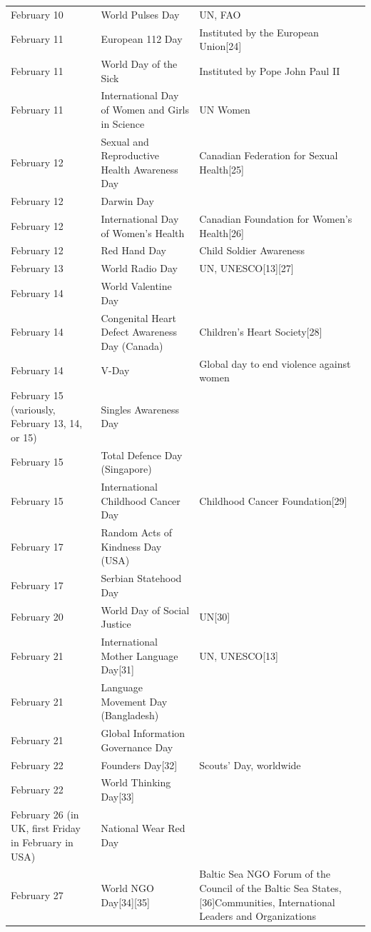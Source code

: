 \documentclass[
]{book}
\begin{document}
\begin{longtable}[t]{>{\raggedright\arraybackslash}p{8em}>{\raggedright\arraybackslash}p{20em}>{\raggedright\arraybackslash}p{12em}}
\addlinespace
February 10 & World Pulses Day & UN, FAO\\
February 11 & European 112 Day & Instituted by the European Union[24]\\
February 11 & World Day of the Sick & Instituted by Pope John Paul II\\
February 11 & International Day of Women and Girls in Science & UN Women\\
February 12 & Sexual and Reproductive Health Awareness Day & Canadian Federation for Sexual Health[25]\\
\addlinespace
February 12 & Darwin Day & \\
February 12 & International Day of Women's Health & Canadian Foundation for Women's Health[26]\\
February 12 & Red Hand Day & Child Soldier Awareness\\
February 13 & World Radio Day & UN, UNESCO[13][27]\\
February 14 & World Valentine Day & \\
\addlinespace
February 14 & Congenital Heart Defect Awareness Day (Canada) & Children's Heart Society[28]\\
February 14 & V-Day & Global day to end violence against women\\
February 15 (variously, February 13, 14, or 15) & Singles Awareness Day & \\
February 15 & Total Defence Day (Singapore) & \\
February 15 & International Childhood Cancer Day & Childhood Cancer Foundation[29]\\
\addlinespace
February 17 & Random Acts of Kindness Day (USA) & \\
February 17 & Serbian Statehood Day & \\
February 20 & World Day of Social Justice & UN[30]\\
February 21 & International Mother Language Day[31] & UN, UNESCO[13]\\
February 21 & Language Movement Day (Bangladesh) & \\
\addlinespace
February 21 & Global Information Governance Day & \\
February 22 & Founders Day[32] & Scouts' Day, worldwide\\
February 22 & World Thinking Day[33] & \\
February 26 (in UK, first Friday in February in USA) & National Wear Red Day & \\
February 27 & World NGO Day[34][35] & Baltic Sea NGO Forum of the Council of the Baltic Sea States,[36]Communities, International Leaders and Organizations\\

\end{longtable}
\end{document}
